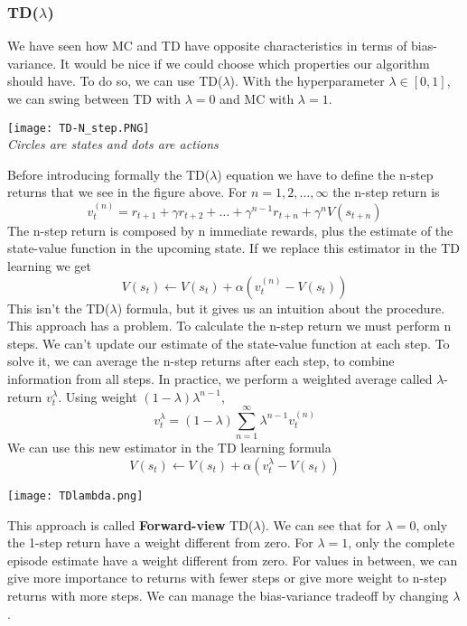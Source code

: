 \documentclass[main.tex]{subfiles}
\begin{document}
\subsubsection{TD($\lambda$)}
We have seen how MC and TD have opposite characteristics in terms of bias-variance. It would be nice if we could choose which properties our algorithm should have. To do so, we can use TD($\lambda$). With the hyperparameter $\lambda \in [0,1]$, we can swing between TD with $\lambda=0$ and MC with $\lambda=1$.
\begin{center}
    \texttt{[image: TD-N\_step.PNG]} \\
    \textit{Circles are states and dots are actions}
\end{center}
Before introducing formally the TD($\lambda$) equation  we have to define the n-step returns that we see in the figure above.
For $n=1,2,\dots,\infty$ the n-step return is
\begin{equation}
    v_t^{(n)} = r_{t+1} + \gamma r_{t+2} + \dots + \gamma^{n-1}r_{t+n} + \gamma^n V(s_{t+n})
\end{equation}
The n-step return is composed by n immediate rewards, plus the estimate of the state-value function in the upcoming state.
If we replace this estimator in the TD learning we get
\begin{equation*}
    V(s_t) \leftarrow V(s_t) + \alpha(v_t^{(n)}-V(s_t))
\end{equation*}
This isn't the TD($\lambda$) formula, but it gives us an intuition about the procedure. This approach has a problem. To calculate the n-step return we must perform n steps. We can't update our estimate of the state-value function at each step. To solve it, we can average the n-step returns after each step, to combine information from all steps.
In practice, we perform a weighted average called $\lambda$-return $v_t^{\lambda}$. Using weight $(1-\lambda)\lambda^{n-1}$,
\begin{equation}
    v_t^{\lambda} = (1-\lambda) \sum_{n=1}^{\infty} \lambda^{n-1} v_t^{(n)}
\end{equation}
We can use this new estimator in the TD learning formula
\begin{equation}
     V(s_t) \leftarrow V(s_t) + \alpha(v_t^{\lambda}-V(s_t))
\end{equation}

\begin{center}
    \texttt{[image: TDlambda.png]}
\end{center}
This approach is called \textbf{Forward-view} TD($\lambda$). We can see that for $\lambda=0$, only the 1-step return have a weight different from zero. For $\lambda=1$, only the complete episode estimate have a weight different from zero. For values in between, we can give more importance to returns with fewer steps or give more weight to n-step returns with more steps. We can manage the bias-variance tradeoff by changing $\lambda$. 
\end{document}
